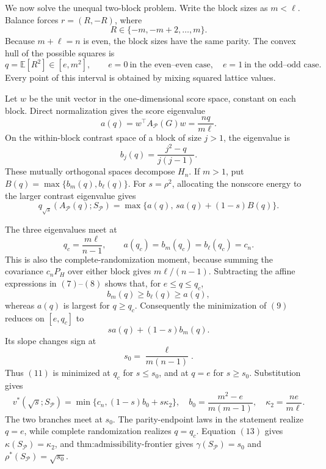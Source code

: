 We now solve the unequal two-block problem.  Write the block sizes as \(m<\ell\).  Balance forces \(r=(R,-R)\), where
\[
R\in\{-m,-m+2,\ldots,m\}.
\]
Because \(m+\ell=n\) is even, the block sizes have the same parity.  The convex hull of the possible squares is
\[
q=\mathbb E[R^2]\in[e,m^2],
\qquad
e=0\ \text{in the even--even case},\quad e=1\ \text{in the odd--odd case}.
\tag{6}
\]
Every point of this interval is obtained by mixing squared lattice values.

Let \(w\) be the unit vector in the one-dimensional score space, constant on each block.  Direct normalization gives the score eigenvalue
\[
a(q)=w^\top A_{\mathcal P}(G)w=\frac{nq}{m\ell}.
\tag{7}
\]
On the within-block contrast space of a block of size \(j>1\), the eigenvalue is
\[
b_j(q)=\frac{j^2-q}{j(j-1)}.
\tag{8}
\]
These mutually orthogonal spaces decompose \(H_n\).  If \(m>1\), put \(B(q)=\max\{b_m(q),b_\ell(q)\}\).  For \(s=\rho^2\), allocating the nonscore energy to the larger contrast eigenvalue gives
\[
q_{\sqrt{s}}(A_{\mathcal P}(q);S_{\mathcal P})
=\max\{a(q),\,sa(q)+(1-s)B(q)\}.
\tag{9}
\]

The three eigenvalues meet at
\[
q_c=\frac{m\ell}{n-1},
\qquad
a(q_c)=b_m(q_c)=b_\ell(q_c)=c_n.
\tag{10}
\]
This is also the complete-randomization moment, because summing the covariance \(c_nP_H\) over either block gives \(m\ell/(n-1)\).  Subtracting the affine expressions in \((7)\)--\((8)\) shows that, for \(e\leq q\leq q_c\),
\[
b_m(q)\geq b_\ell(q)\geq a(q),
\]
whereas \(a(q)\) is largest for \(q\geq q_c\).  Consequently the minimization of \((9)\) reduces on \([e,q_c]\) to
\[
sa(q)+(1-s)b_m(q).
\tag{11}
\]
Its slope changes sign at
\[
s_0=\frac{\ell}{m(n-1)}.
\tag{12}
\]
Thus \((11)\) is minimized at \(q_c\) for \(s\leq s_0\), and at \(q=e\) for \(s\geq s_0\).  Substitution gives
\[
v^*(\sqrt{s};S_{\mathcal P})
=\min\{c_n,(1-s)b_0+s\kappa_2\},
\quad
b_0=\frac{m^2-e}{m(m-1)},
\quad
\kappa_2=\frac{ne}{m\ell}.
\tag{13}
\]
The two branches meet at \(s_0\).  The parity-endpoint laws in the statement realize \(q=e\), while complete randomization realizes \(q=q_c\).  Equation \((13)\) gives \(\kappa(S_{\mathcal P})=\kappa_2\), and \(\text{thm:admissibility-frontier}\) gives \(\gamma(S_{\mathcal P})=s_0\) and \(\rho^*(S_{\mathcal P})=\sqrt{s_0}\).

